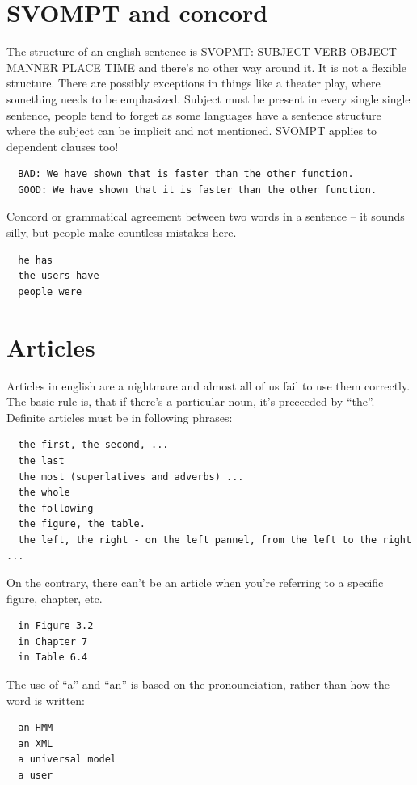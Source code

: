 \section*{SVOMPT and concord}

The structure of an english sentence is SVOPMT: SUBJECT VERB OBJECT MANNER PLACE TIME and there's no other way around it. It is not a flexible structure. There are possibly exceptions in things like a theater play, where something needs to be emphasized. Subject must be present in every single single sentence, people tend to forget as some languages have a sentence structure where the subject can be implicit and not mentioned. SVOMPT applies to dependent clauses too!
\begin{verbatim}
  BAD: We have shown that is faster than the other function. 
  GOOD: We have shown that it is faster than the other function. 
\end{verbatim}

\noindent Concord or grammatical agreement between two words in a sentence -- it sounds silly, but people make countless mistakes here.

\begin{verbatim}
  he has 
  the users have 
  people were 
\end{verbatim}

\section*{Articles}

Articles in english are a nightmare and almost all of us fail to use them correctly. The basic rule is, that if there's a particular noun, it's preceeded by ``the''. Definite articles must be in following phrases:
\begin{verbatim}
  the first, the second, ...
  the last
  the most (superlatives and adverbs) ...
  the whole 
  the following 
  the figure, the table. 
  the left, the right - on the left pannel, from the left to the right ... 
\end{verbatim}

\noindent On the contrary, there can't be an article when you're referring to a specific figure, chapter, etc.
\begin{verbatim}
  in Figure 3.2
  in Chapter 7
  in Table 6.4
\end{verbatim}

\begin{samepage}
\noindent The use of ``a'' and ``an'' is based on the pronounciation, rather than how the word is written:
\begin{verbatim}
  an HMM
  an XML
  a universal model
  a user
\end{verbatim}
\end{samepage}

